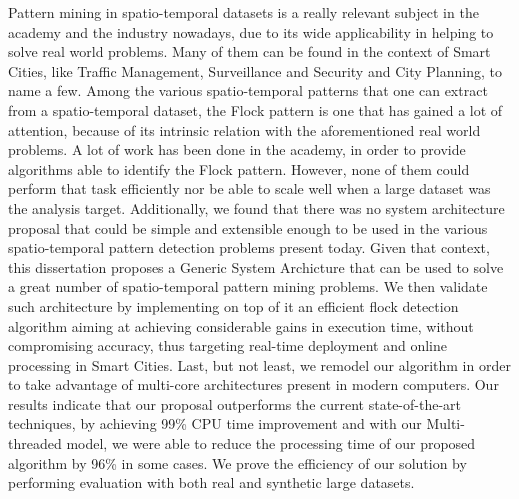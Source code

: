 Pattern mining in spatio-temporal datasets is a really relevant subject in the academy and the industry nowadays, due to
its wide applicability in helping to solve real world problems. Many of them can be found in the context of Smart
Cities, like Traffic Management, Surveillance and Security and City Planning, to name a few. Among the various
spatio-temporal patterns that one can extract from a spatio-temporal dataset, the Flock pattern is one that has gained a
lot of attention, because of its intrinsic relation with the aforementioned real world problems. A lot of work has been
done in the academy, in order to provide algorithms able to identify the Flock pattern. However, none of them could
perform that task efficiently nor be able to scale well when a large dataset was the analysis target. Additionally, we
found that there was no system architecture proposal that could be simple and extensible enough to be used in the
various spatio-temporal pattern detection problems present today. Given that context, this dissertation proposes a
Generic System Archicture that can be used to solve a great number of spatio-temporal pattern mining problems. We then
validate such architecture by implementing on top of it an efficient flock detection algorithm aiming at achieving
considerable gains in execution time, without compromising accuracy, thus targeting real-time deployment and online
processing in Smart Cities. Last, but not least, we remodel our algorithm in order to take advantage of multi-core
architectures present in modern computers. Our results indicate that our proposal outperforms the current
state-of-the-art techniques, by achieving 99\% CPU time improvement and with our Multi-threaded model, we were able to
reduce the processing time of our proposed algorithm by 96\% in some cases. We prove the efficiency of our solution by
performing evaluation with both real and synthetic large datasets.
